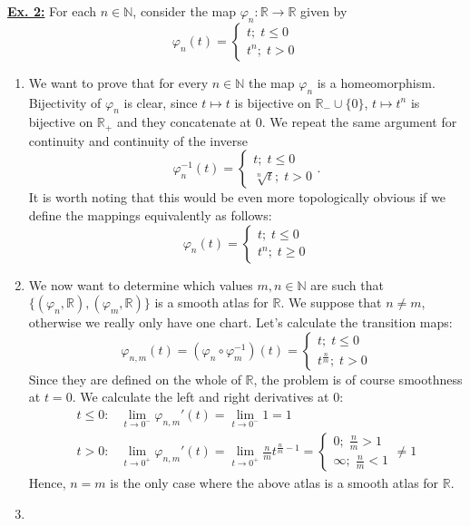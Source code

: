 \documentclass[a4paper, 12pt]{article} %
\newcommand{\N}{\mathbb{N}}
\newcommand{\R}{\mathbb{R}}
\begin{document}
\underline{\textbf{Ex. 2:}}
For each $n \in \N$, consider the map $\varphi_n\colon \R \to \R$ given by
\[
\varphi_n(t) = \begin{cases}
t; \; t \leq 0 \\
t^n; \; t > 0
\end{cases}
\]
\begin{enumerate}[label=(\alph*)]
\item
We want to prove that for every $n \in \N$ the map $\varphi_n$ is a homeomorphism. Bijectivity of $\varphi_n$ is clear, since $t \mapsto t$ is bijective on $\R_{-}\cup\lbrace 0 \rbrace$, $t \mapsto t^n$ is bijective on $\R_{+}$ and they concatenate at $0$. We repeat the same argument for continuity and continuity of the inverse
\[
\varphi_n^{-1}(t) = \begin{cases}
t; \; t \leq 0 \\
\sqrt[n]{t}; \; t > 0
\end{cases}.
\]
It is worth noting that this would be even more topologically obvious if we define the mappings equivalently as follows:
\[
\varphi_n(t) = \begin{cases}
t;\; t \leq 0 \\
t^n; \; t \geq 0
\end{cases}
\]
\item
We now want to determine which values $m,n \in \N$ are such that $\lbrace(\varphi_n, \R), (\varphi_m, \R)\rbrace$ is a smooth atlas for $\R$. We suppose that $n \neq m$, otherwise we really only have one chart. Let's calculate the transition maps:
\[
\varphi_{n,m}(t) = (\varphi_n\circ\varphi_m^{-1})(t) = \begin{cases}
t; \; t \leq 0 \\
t^{\frac{n}{m}}; \; t > 0
\end{cases}
\]
Since they are defined on the whole of $\R$, the problem is of course smoothness at $t = 0$. We calculate the left and right derivatives at $0$:
\begin{align*}
t \leq 0:& \lim_{t \to 0^{-}} \varphi_{n,m}'(t) = \lim_{t \to 0^{-}} 1 = 1 \\
t > 0:& \lim_{t \to 0^{+}} \varphi_{n,m}'(t) = \lim_{t \to 0^{+}} \frac{n}{m}t^{\frac{n}{m}-1} = \begin{cases}
0; \; \frac{n}{m} > 1 \\
\infty; \; \frac{n}{m} < 1
\end{cases}
\neq 1
\end{align*}
Hence, $n=m$ is the only case where the above atlas is a smooth atlas for $\R$.
\item

\end{enumerate}
\end{document}
